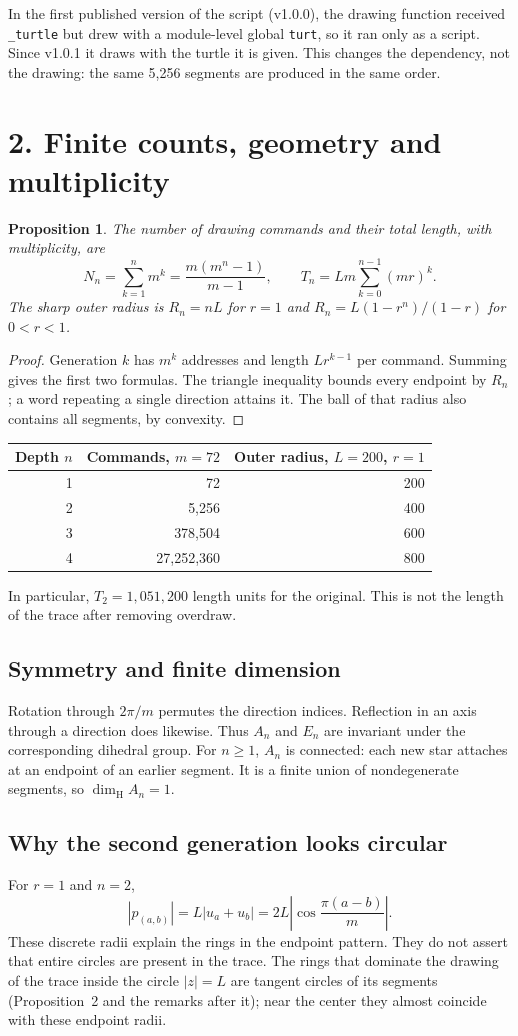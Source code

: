 \documentclass[11pt,a4paper]{article}
\newtheorem{proposition}{Proposition}
\newcommand{\dimH}{\dim_{\mathrm H}}
\newcommand{\sectiontitle}[1]{\section*{\sffamily\color{ink}#1}}
\begin{document}
In the first published version of the script (v1.0.0), the drawing function
received \texttt{\_turtle} but drew with a module-level global \texttt{turt},
so it ran only as a script. Since v1.0.1 it draws with the turtle it is
given. This changes the dependency, not the drawing: the same 5,256 segments
are produced in the same order.

\newpage
\sectiontitle{2. Finite counts, geometry and multiplicity}
\begin{proposition}
The number of drawing commands and their total length, with multiplicity, are
\[
N_n=\sum_{k=1}^n m^k=\frac{m(m^n-1)}{m-1},\qquad
T_n=Lm\sum_{k=0}^{n-1}(mr)^k.
\]
The sharp outer radius is $R_n=nL$ for $r=1$ and
$R_n=L(1-r^n)/(1-r)$ for $0<r<1$.
\end{proposition}
\begin{proof}
Generation $k$ has $m^k$ addresses and length $Lr^{k-1}$ per command.
Summing gives the first two formulas. The triangle inequality bounds every
endpoint by $R_n$; a word repeating a single direction attains it. The ball
of that radius also contains all segments, by convexity.
\end{proof}

\begin{center}
\begin{tabular}{r r r}
\toprule
Depth $n$ & Commands, $m=72$ & Outer radius, $L=200$, $r=1$\\
\midrule
1 & 72 & 200\\
2 & 5,256 & 400\\
3 & 378,504 & 600\\
4 & 27,252,360 & 800\\
\bottomrule
\end{tabular}
\end{center}
In particular, $T_2=1{,}051{,}200$ length units for the original. This is not
the length of the trace after removing overdraw.

\subsection*{Symmetry and finite dimension}
Rotation through $2\pi/m$ permutes the direction indices. Reflection in an
axis through a direction does likewise. Thus $A_n$ and $E_n$ are invariant
under the corresponding dihedral group. For $n\ge1$, $A_n$ is connected:
each new star attaches at an endpoint of an earlier segment. It is a finite
union of nondegenerate segments, so $\dimH A_n=1$.

\subsection*{Why the second generation looks circular}
For $r=1$ and $n=2$,
\[
|p_{(a,b)}|=L|u_a+u_b|
=2L\left|\cos\frac{\pi(a-b)}m\right|.
\]
These discrete radii explain the rings in the endpoint pattern. They do not
assert that entire circles are present in the trace. The rings that dominate
the drawing of the trace inside the circle $|z|=L$ are tangent circles of its
segments (Proposition~2 and the remarks after it); near the center they
almost coincide with these endpoint radii.
\end{document}
